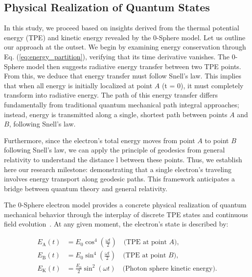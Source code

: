 \documentclass[%
 reprint,
 amsmath,amssymb,
 aps,
]{revtex4-1}
\numberwithin{equation}{section}%
\begin{document}
\subsection{\label{sec:Physical Realization of}Physical Realization of Quantum States}

In this study, we proceed based on insights derived from the thermal potential energy (TPE) and kinetic energy revealed by the 0-Sphere model. Let us outline our approach at the outset. We begin by examining energy conservation through Eq. (\ref{eq:energy_partition}), verifying that its time derivative vanishes. The 0-Sphere model then suggests radiative energy transfer between two TPE points. From this, we deduce that energy transfer must follow Snell's law. This implies that when all energy is initially localized at point $A$ (t = 0), it must completely transform into radiative energy. The path of this energy transfer differs fundamentally from traditional quantum mechanical path integral approaches; instead, energy is transmitted along a single, shortest path between points $A$ and $B$, following Snell's law.

Furthermore, since the electron's total energy moves from point $A$ to point $B$ following Snell's law, we can apply the principle of geodesics from general relativity to understand the distance l between these points. Thus, we establish here our research milestone: demonstrating that a single electron's traveling involves energy transport along geodesic paths. This framework anticipates a bridge between quantum theory and general relativity.

The 0-Sphere electron model provides a concrete physical realization of quantum mechanical behavior through the interplay of discrete TPE states and continuous field evolution~\cite{hanamura2018}. At any given moment, the electron's state is described by:

\begin{equation}
    \begin{split}
        E_{\mathrm{A}}(t) &= E_0\cos^4\left(\frac{\omega t}{2}\right) \quad \text{(TPE at point $A$)}, \\
        E_{\mathrm{B}}(t) &= E_0\sin^4\left(\frac{\omega t}{2}\right) \quad \text{(TPE at point $B$)}, \\
        E_{\mathrm{K}}(t) &= \frac{E_0}{2}\sin^2(\omega t) \quad \text{(Photon sphere kinetic energy)}.
    \end{split}
    \label{eq:energy_distribution}
\end{equation}
\end{document}
